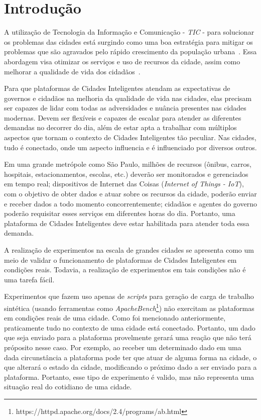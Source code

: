 \chapter{Introdução}
\label{cap:introducao}


A utilização de Tecnologia da Informação e Comunicação - \textit{TIC} - para solucionar os problemas das cidades está surgindo como uma boa estratégia para mitigar os problemas que são agravados pelo rápido crescimento da população urbana~\cite{chourabi_2012}.
Essa abordagem visa otimizar os serviços e uso de recursos da cidade, assim como melhorar a qualidade de vida dos cidadãos~\cite{santana_2016}.

Para que plataformas de Cidades Inteligentes atendam as expectativas de governos e cidadãos na melhoria da qualidade de vida nas cidades, elas precisam ser capazes de lidar com todas as adversidades e
nuância presentes nas cidades modernas.
Devem ser flexíveis e capazes de escalar para atender as diferentes demandas no decorrer do dia, além de estar apta a trabalhar com múltiplos aspectos que tornam o contexto de Cidades Inteligentes tão
peculiar.
Nas cidades, tudo é conectado, onde um aspecto influencia e é influenciado por diversos outros.

Em uma grande metrópole como São Paulo, milhões de recursos (ônibus, carros, hospitais, estacionamentos, escolas, etc.) deverão ser monitorados e gerenciados em tempo real;
dispositivos de Internet das Coisas (\textit{Internet of Things - IoT}), com o objetivo de obter dados e atuar sobre os recursos da cidade, poderão enviar e receber dados a todo momento concorrentemente;
cidadãos e agentes do governo poderão requisitar esses serviços em diferentes horas do dia.
Portanto, uma plataforma de Cidades Inteligentes deve estar habilitada para atender toda essa demanda.

A realização de experimentos na escala de grandes cidades se apresenta como um meio de validar o funcionamento de plataformas de Cidades Inteligentes em condições reais.
Todavia, a realização de experimentos em tais condições não é uma tarefa fácil.

Experimentos que fazem uso apenas de \textit{scripts} para geração de carga de trabalho sintética (usando ferramentas como \textit{ApacheBench}\footnote{https://httpd.apache.org/docs/2.4/programs/ab.html})
não exercitam as plataformas em condições reais de uma cidade.
Como foi mencionado anteriormente, praticamente tudo no contexto de uma cidade está conectado.
Portanto, um dado que seja enviado para a plataforma provelmente gerará uma reação que não terá próposito nesse caso.
Por exemplo, ao receber um determinado dado em uma dada circunstância a plataforma pode ter que atuar de alguma forma na cidade, o que alterará o estado da cidade, modificando o próximo dado a ser enviado 
para a plataforma.
Portanto, esse tipo de experimento é valido, mas não representa uma situação real do cotidiano de uma cidade.

